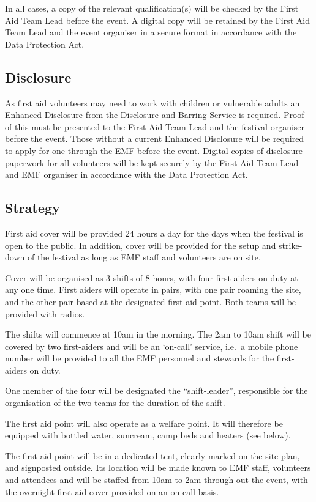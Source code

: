 In all cases, a copy of the relevant qualification(s) will be checked by the
First Aid Team Lead before the event. A digital copy will be retained by the
First Aid Team Lead and the event organiser in a secure format in accordance
with the Data Protection Act.

\subsection{Disclosure}
As first aid volunteers may need to work with children or vulnerable adults an
Enhanced Disclosure from the Disclosure and Barring Service is required. Proof
of this must be presented to the First Aid Team Lead and the festival organiser
before the event. Those without a current Enhanced Disclosure will be required
to apply for one through the EMF before the event. Digital copies of disclosure
paperwork for all volunteers will be kept securely by the First Aid Team Lead and
EMF organiser in accordance with the Data Protection Act.

\subsection{Strategy}
First aid cover will be provided 24 hours a day for the days when the festival
is open to the public. In addition, cover will be provided for the setup and
strike-down of the festival as long as EMF staff and volunteers are on site.

Cover will be organised as 3 shifts of 8 hours, with four first-aiders on duty
at any one time. First aiders will operate in pairs, with one pair roaming the
site, and the other pair based at the designated first aid point. Both teams
will be provided with radios.

The shifts will commence at 10am in the morning. The 2am to 10am shift will
be covered by two first-aiders and will be an `on-call’ service, i.e.\ a mobile
phone number will be provided to all the EMF personnel and stewards for the
first-aiders on duty.

One member of the four will be designated the ``shift-leader'', responsible for
the organisation of the two teams for the duration of the shift.

The first aid point will also operate as a welfare point. It will therefore be
equipped with bottled water, suncream, camp beds and heaters (see below).

The first aid point will be in a dedicated tent, clearly marked on the site
plan, and signposted outside. Its location will be made known to EMF staff,
volunteers and attendees and will be staffed from 10am to 2am through-out
the event, with the overnight first aid cover provided on an on-call basis.

